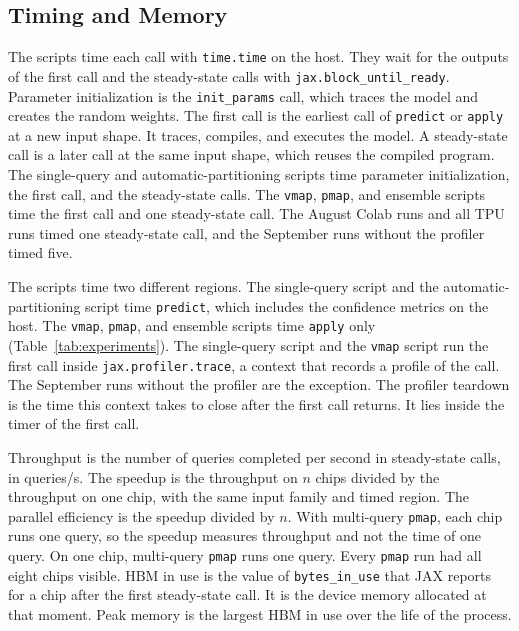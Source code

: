 \subsection{Timing and Memory}\label{sec:timing}
The scripts time each call with \texttt{time.time} on the host. They wait for the outputs of the first call and the
steady-state calls with \texttt{jax.block\_until\_ready}. Parameter initialization is the \texttt{init\_params} call,
which traces the model and creates the random weights. The first call is the earliest call of \texttt{predict} or
\texttt{apply} at a new input shape. It traces, compiles, and executes the model. A steady-state call is a later call at
the same input shape, which reuses the compiled program. The single-query and automatic-partitioning scripts time
parameter initialization, the first call, and the steady-state calls. The \texttt{vmap}, \texttt{pmap}, and ensemble
scripts time the first call and one steady-state call. The August Colab runs and all TPU runs timed one steady-state
call, and the September runs without the profiler timed five. %

The scripts time two different regions. The single-query script and the automatic-partitioning script time
\texttt{predict}, which includes the confidence metrics on the host. The \texttt{vmap}, \texttt{pmap}, and ensemble
scripts time \texttt{apply} only (Table~\ref{tab:experiments}). The single-query script and the \texttt{vmap} script
run the first call inside \texttt{jax.profiler.trace}, a context that records a profile of the call. The September runs
without the profiler are the exception. The profiler teardown is the time this context takes to close after the first
call returns. It lies inside the timer of the first call.

Throughput is the number of queries completed per second in steady-state calls, in queries/s. The speedup is the
throughput on $n$ chips divided by the throughput on one chip, with the same input family and timed region. The parallel
efficiency is the speedup divided by $n$. With multi-query \texttt{pmap}, each chip runs one query, so the speedup
measures throughput and not the time of one query. On one chip, multi-query \texttt{pmap} runs one query. Every
\texttt{pmap} run had all eight chips visible.
HBM in use is the value of \texttt{bytes\_in\_use} that JAX reports for a chip after the first steady-state call. It
is the device memory allocated at that moment. Peak memory is the largest HBM in use over the life of the process.

